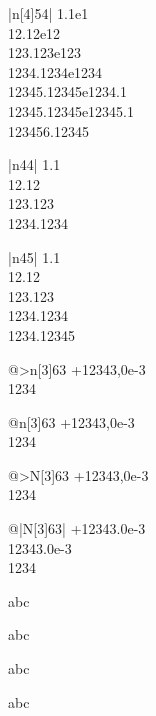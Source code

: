 \documentclass[portuges,french,ngerman,english,a4paper,fleqn,11pt]{article}
\begin{document}
\npfourdigitnosep
\begin{tabular}{|n[4]{5}{4}|}
  1.1e1 \\
  12.12e12 \\
  123.123e123 \\
  1234.1234e1234 \\
  12345.12345e1234.1 \\
  12345.12345e12345.1 \\
  123456.12345
\end{tabular}

\begin{tabular}{|n{4}{4}|}
  1.1 \\
  12.12 \\
  123.123 \\
  1234.1234
\end{tabular}

\begin{tabular}{|n{4}{5}|}
  1.1 \\
  12.12 \\
  123.123 \\
  1234.1234 \\
  1234.12345
\end{tabular}

\def\gammel{1234}%
%
\begin{tabular}{@{}>{\boldmath}n[3]{6}{3}} %
  +12343,0e-3\\
  \gammel
\end{tabular}

\begin{tabular}{@{}n[3]{6}{3}}
  +12343,0e-3\\
  \gammel
\end{tabular}

\begin{tabular}{@{}>{\bfseries}N[3]{6}{3}} %
  +12343,0e-3\\
  \gammel
\end{tabular}

\begin{tabular}{@{}|N[3]{6}{3}|}
  +12343.0e-3 \\
  12343.0e-3 \\
  \gammel
\end{tabular}



 abc

 abc

 abc

 abc
\end{document}

